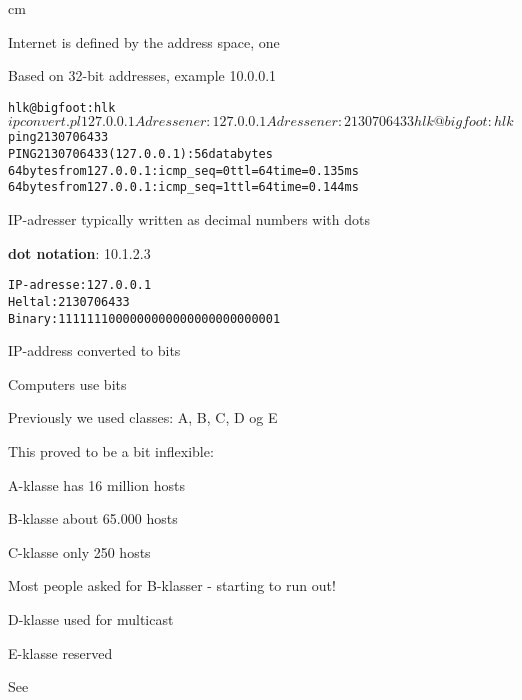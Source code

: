 \documentclass[Screen16to9,17pt]{foils}
\begin{document}
 cm

\begin{list1}
\item Internet is defined by the address space, one
\item Based on 32-bit addresses, example 10.0.0.1
\end{list1}


\begin{alltt}
hlk@bigfoot:hlk$ ipconvert.pl 127.0.0.1
Adressen er: 127.0.0.1
Adressen er: 2130706433
hlk@bigfoot:hlk$ ping 2130706433
PING 2130706433 (127.0.0.1): 56 data bytes
64 bytes from 127.0.0.1: icmp_seq=0 ttl=64 time=0.135 ms
64 bytes from 127.0.0.1: icmp_seq=1 ttl=64 time=0.144 ms
\end{alltt}

\begin{list1}
\item IP-adresser typically written as decimal numbers with dots
\item {\bf dot notation}: 10.1.2.3
\end{list1}


\begin{alltt}
IP-adresse: 127.0.0.1
Heltal:	2130706433
Binary:	1111111000000000000000000000001
\end{alltt}

\begin{list1}
\item IP-address converted to bits
\item Computers use bits
\end{list1}


\begin{list1}
\item Previously we used classes: A, B, C, D og E
\item This proved to be a bit inflexible:
\begin{list2}
\item A-klasse has 16 million hosts
\item B-klasse about 65.000 hosts
\item C-klasse only 250 hosts
\end{list2}
\item Most people asked for B-klasser - starting to run out!
\item D-klasse used for multicast
\item E-klasse reserved
\item See 
\end{list1}
\end{document}
